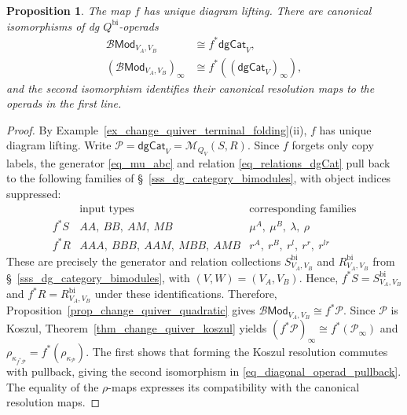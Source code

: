 \documentclass[11pt,letterpaper]{article}
\numberwithin{equation}{section}
\theoremstyle{plain}
\newtheorem{prop}[thm]{Proposition}
\theoremstyle{definition}
\theoremstyle{remark}
\begin{document}
\begin{prop}\label{prop_diagonal_bimodule_pullback}
The map $f$ has unique diagram lifting. There are canonical
isomorphisms of dg $Q^{\mathrm{bi}}$-operads
\begin{equation}\label{eq_diagonal_operad_pullback}
\begin{aligned}
 \mathscr B\mathsf{Mod}_{V_A,V_B}
 &\cong f^*\mathsf{dgCat}_V,\\
 (\mathscr B\mathsf{Mod}_{V_A,V_B})_\infty
 &\cong f^*((\mathsf{dgCat}_V)_\infty),
\end{aligned}
\end{equation}
and the second isomorphism identifies their canonical resolution maps
to the operads in the first line.
\end{prop}
\begin{proof}
By Example~\ref{ex_change_quiver_terminal_folding}(ii), $f$ has unique
diagram lifting. Write $\mathscr P=\mathsf{dgCat}_V
=\mathscr M_{Q_V}(S,R)$. Since $f$ forgets only copy labels,
the generator \eqref{eq_mu_abc} and relation \eqref{eq_relations_dgCat}
pull back to the following families of
\S~\ref{sss_dg_category_bimodules}, with object indices suppressed:
\[
\begin{array}{c|c|c}
 & \text{input types} & \text{corresponding families} \\ \hline
 f^*S & AA,\ BB,\ AM,\ MB
      & \mu^A,\ \mu^B,\ \lambda,\ \rho \\
 f^*R & AAA,\ BBB,\ AAM,\ MBB,\ AMB
      & r^A,\ r^B,\ r^l,\ r^r,\ r^{lr}
\end{array}
\]
These are precisely the generator and relation collections
$S^{\mathrm{bi}}_{V_A,V_B}$ and $R^{\mathrm{bi}}_{V_A,V_B}$ from
\S~\ref{sss_dg_category_bimodules}, with $(V,W)=(V_A,V_B)$.
Hence, $
 f^*S=S^{\mathrm{bi}}_{V_A,V_B}$ and $
 f^*R=R^{\mathrm{bi}}_{V_A,V_B}$ under these identifications.
 Therefore,
Proposition~\ref{prop_change_quiver_quadratic} gives
$\mathscr B\mathsf{Mod}_{V_A,V_B}\cong f^*\mathscr P$.
Since $\mathscr P$ is Koszul, Theorem~\ref{thm_change_quiver_koszul}
yields
$ (f^*\mathscr P)_\infty\cong f^*(\mathscr P_\infty)$ and $
 \rho_{\kappa_{f^*\mathscr P}}
 =f^*(\rho_{\kappa_{\mathscr P}})$.
The first shows that forming the Koszul resolution commutes with
pullback, giving the second isomorphism in
\eqref{eq_diagonal_operad_pullback}. The equality of the $\rho$-maps
expresses its compatibility with the canonical resolution maps.
\end{proof}
\end{document}
